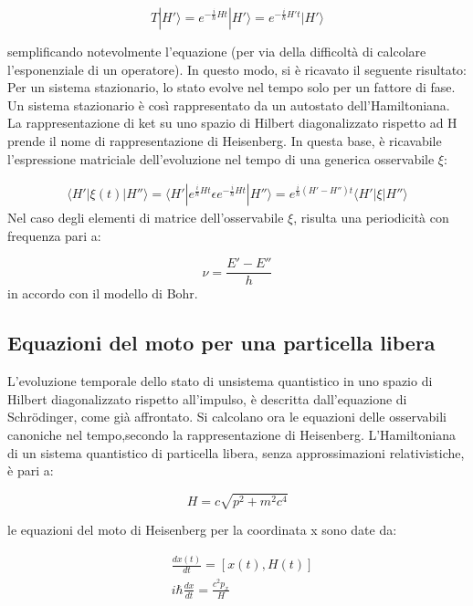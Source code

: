 \documentclass{article}
\begin{document}
\begin{equation}
  T |H'\rangle = e^{-\frac{i}{\hbar}Ht}|H'\rangle = e^{-\frac{i}{\hbar}H't}|H'\rangle
\end{equation}

semplificando notevolmente l'equazione (per via della difficoltà di calcolare l'esponenziale di un operatore).
In questo modo, si è ricavato il seguente risultato: Per un sistema stazionario, lo stato evolve nel tempo solo per un fattore di fase.
Un sistema stazionario è così rappresentato da un autostato dell'Hamiltoniana.
La rappresentazione di ket su uno spazio di Hilbert diagonalizzato rispetto ad H prende il nome di rappresentazione di Heisenberg.
In questa base, è ricavabile l'espressione matriciale dell'evoluzione nel tempo di una generica osservabile $\xi$:

\begin{equation}
  \begin{aligned}
    \langle H'|\xi(t)|H''\rangle =\langle H'|e^{\frac{i}{\hbar}Ht}\epsilon e^{-\frac{i}{\hbar}Ht}|H''\rangle =e^{\frac{i}{\hbar}(H'-H'')t}\langle H'|\xi|H''\rangle
  \end{aligned}
\end{equation}
Nel caso degli elementi di matrice dell'osservabile $\xi$, risulta una periodicità con frequenza pari a:

\begin{equation}
  \nu= \frac{E'-E''}{h}
\end{equation}
in accordo con il modello di Bohr.

\subsection{Equazioni del moto per una particella libera}
L'evoluzione temporale dello stato di unsistema quantistico in uno spazio di Hilbert diagonalizzato rispetto all'impulso,
è descritta dall'equazione di Schrödinger, come già affrontato.
Si calcolano ora le equazioni delle osservabili canoniche nel tempo,secondo la rappresentazione di Heisenberg.
L'Hamiltoniana di un sistema quantistico di particella libera, senza approssimazioni relativistiche, è pari a:

\begin{equation}
  H=c\sqrt{p^2+m^2c^4}
\end{equation}

le equazioni del moto di Heisenberg per la coordinata x sono date da:

\begin{equation}
  \begin{aligned}
     & \frac{dx(t)}{dt}= [x(t),H(t)]          \\
     & i\hbar \frac{dx}{dt}= \frac{c^2p_x}{H}
  \end{aligned}
\end{equation}
\end{document}
